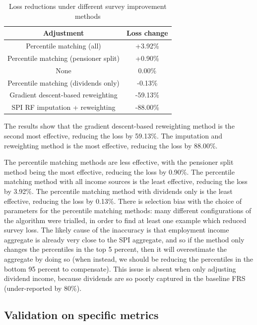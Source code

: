 \documentclass[10pt,journal,compsoc]{IEEEtran}
\begin{document}
\begin{table}[!ht]
  \caption{Loss reductions under different survey improvement methods}
  \label{tab:loss_reduction}
  \centering
  \begin{tabular}{cc}
    \hline\hline
    Adjustment & Loss change \\
    \hline
    Percentile matching (all) &      +3.92\% \\
    Percentile matching (pensioner split) &      +0.90\% \\
    None &       0.00\% \\
    Percentile matching (dividends only) &      -0.13\% \\
    Gradient descent-based reweighting &     -59.13\% \\
    SPI RF imputation + reweighting &     -88.00\% \\
  \hline\hline
  \end{tabular}
\end{table}

The results show that the gradient descent-based reweighting method is the second most effective, reducing the loss by 59.13\%. The imputation and reweighting method is the most effective, reducing the loss by 88.00\%. 

The percentile matching methods are less effective, with the pensioner split method being the most effective, reducing the loss by 0.90\%. The percentile matching method with all income sources is the least effective, reducing the loss by 3.92\%. The percentile matching method with dividends only is the least effective, reducing the loss by 0.13\%. There is selection bias with the choice of parameters for the percentile matching methods: many different configurations of the algorithm were trialled, in order to find at least one example which reduced survey loss. The likely cause of the inaccuracy is that employment income aggregate is already very close to the SPI aggregate, and so if the method only changes the percentiles in the top 5 percent, then it will overestimate the aggregate by doing so (when instead, we should be reducing the percentiles in the bottom 95 percent to compensate). This issue is absent when only adjusting dividend income, because dividends are so poorly captured in the baseline FRS (under-reported by 80\%).

\subsection{Validation on specific metrics}
\end{document}
